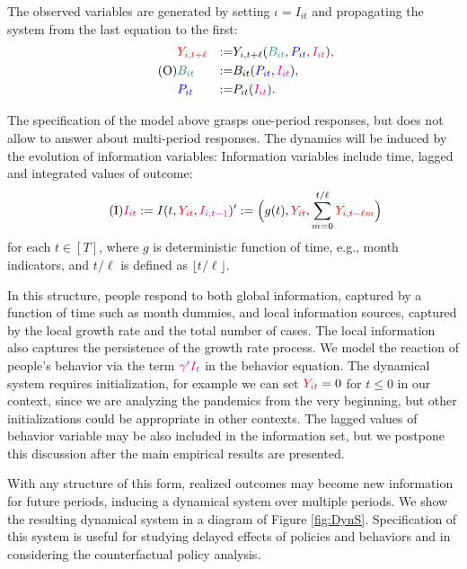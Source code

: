 \documentclass[11pt,reqno,letter]{amsart}
\theoremstyle{definition}
\def\bcolor{\color{ForestGreen}}
\def\pcolor{\color{blue}}
\def\icolor{\color{magenta}}
\def\ycolor{\color{red}}
\begin{document}
The observed variables are generated by setting $\iota = I_{it}$ and propagating
the system from the last equation to the first:
\begin{equation} \label{eqn:SEMO}\tag{O}
\begin{aligned}
& {\ycolor Y_{i,t+\ell}}  & := & Y_{i,t+\ell} ( {\bcolor B_{it} } ,{\pcolor P_{it}}, {\icolor I_{it}}), \\
& {\bcolor B_{it} } & := &   B_{it}({\pcolor P_{it} } ,{\icolor I_{it}}), \\
& {\pcolor P_{it} }& := &  P_{it}({\icolor I_{it}}). \end{aligned}
\end{equation}

The specification of the model above grasps one-period responses, but does not allow
to answer about multi-period responses.  The dynamics will be induced by the evolution
of information variables: Information variables include time, lagged and integrated values of outcome:
\begin{equation}\label{eq:I}\tag{I}
 {\icolor I_{it} } := I(t, {\ycolor Y_{it}},  { \icolor  I_{i, t-1} })' := \Big (g(t) , {\ycolor Y_{it}},  \sum_{m=0}^{t/\ell}
{\ycolor Y_{i,t - \ell m}} \Big )  \end{equation}
 for  each  $t \in [T]$, where $g$ is deterministic function of time, e.g., month indicators,
 and $t/\ell$ is defined as $\lfloor {t/\ell} \rfloor$.


In this structure, people respond to both global information, captured by a function of time such as month dummies, and local information sources, captured by the local growth rate and the total number of cases. The local information also captures the persistence of the growth rate process.  We model the reaction of people's behavior via the term ${\icolor \gamma'I_{t}}$ in the behavior equation.  The dynamical system requires initialization, for example we can set  ${\ycolor Y_{it}} = 0$ for $t \leq 0$ in our context, since we are analyzing the pandemics from the very beginning, but other initializations could be appropriate in other contexts. The  lagged values of behavior variable may be also included in the information set, but we postpone this discussion after the main empirical results are presented.

With any structure of this form, realized outcomes may become new information for future periods, inducing a dynamical system over multiple periods. We show the resulting dynamical system in a diagram of Figure \ref{fig:DynS}.  Specification
of this system is useful for studying delayed effects of policies and behaviors and in considering the counterfactual policy analysis.
\end{document}
